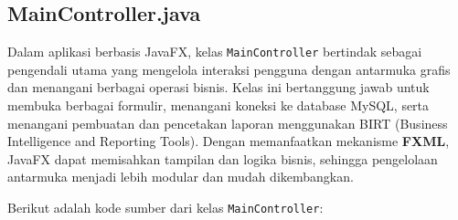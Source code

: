 \subsection{MainController.java}

Dalam aplikasi berbasis JavaFX, kelas \texttt{MainController} bertindak sebagai pengendali utama yang mengelola interaksi pengguna dengan antarmuka grafis dan menangani berbagai operasi bisnis. Kelas ini bertanggung jawab untuk membuka berbagai formulir, menangani koneksi ke database MySQL, serta menangani pembuatan dan pencetakan laporan menggunakan BIRT (Business Intelligence and Reporting Tools). Dengan memanfaatkan mekanisme \textbf{FXML}, JavaFX dapat memisahkan tampilan dan logika bisnis, sehingga pengelolaan antarmuka menjadi lebih modular dan mudah dikembangkan.

Berikut adalah kode sumber dari kelas \texttt{MainController}:

